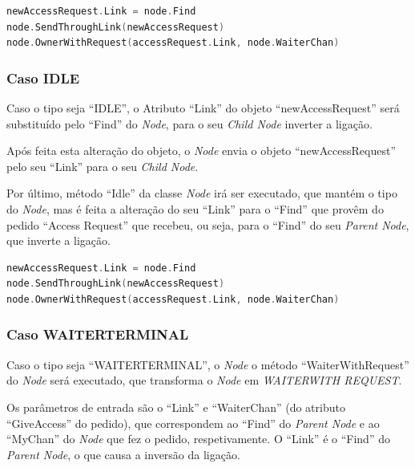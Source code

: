\begin{lstlisting}[caption={Comportamento do \emph{Node} tipo \emph{Owner Terminal} caso receba um pedido \emph{Access Request} no \emph{Channel ``Find''}},language=Go]
newAccessRequest.Link = node.Find
node.SendThroughLink(newAccessRequest)
node.OwnerWithRequest(accessRequest.Link, node.WaiterChan)
\end{lstlisting}



\subsubsection*{Caso IDLE}
Caso o tipo seja ``IDLE'',
o Atributo ``Link'' do objeto ``newAccessRequest'' será substituído pelo ``Find'' do \emph{Node}, para o seu \emph{Child Node} inverter a ligação.

Após feita esta alteração do objeto, o \emph{Node} envia o objeto ``newAccessRequest'' pelo seu ``Link'' para o seu \emph{Child Node}.

Por último,  método ``Idle'' da classe \emph{Node} irá ser executado, que mantém o tipo do \emph{Node}, mas
é feita a alteração do seu ``Link'' para o ``Find'' que provêm do pedido ``Access Request'' que recebeu, ou seja, para o ``Find'' do seu \emph{Parent Node}, 
que inverte a ligação.


\begin{lstlisting}[caption={Comportamento do \emph{Node} tipo \emph{Owner Terminal} caso receba um pedido \emph{Access Request} no \emph{Channel ``Find''}},language=Go]
newAccessRequest.Link = node.Find
node.SendThroughLink(newAccessRequest)
node.OwnerWithRequest(accessRequest.Link, node.WaiterChan)
\end{lstlisting}


\subsubsection*{Caso WAITER\textunderscore TERMINAL}
Caso o tipo seja ``WAITER\textunderscore TERMINAL'', o \emph{Node} o método ``WaiterWithRequest'' do \emph{Node} será executado,
que transforma o \emph{Node} em \emph{WAITER\textunderscore WITH \textunderscore REQUEST}.

Os parâmetros de entrada são o ``Link'' e ``WaiterChan'' (do atributo ``GiveAccess'' do pedido), que correspondem ao ``Find'' do \emph{Parent Node} e ao ``MyChan'' do \emph{Node} que fez o pedido, respetivamente.
O ``Link'' é o ``Find'' do \emph{Parent Node}, o que causa a inversão da ligação.

